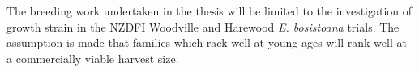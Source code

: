 The breeding work undertaken in the thesis will be limited to the investigation
of growth strain in the NZDFI Woodville and Harewood \textit{E. bosistoana}
trials. The assumption is made that families which rack well at young ages will rank well at a commercially viable harvest size.